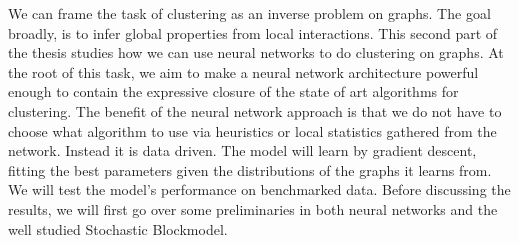 We can frame the task of clustering as an inverse problem on graphs.  The goal broadly, is to infer global properties from local interactions.  This second part of the thesis studies how we can use neural networks to do clustering on graphs.  At the root of this task, we aim to make a neural network architecture powerful enough to contain the expressive closure of the state of art algorithms for clustering.  The benefit of the neural network approach is that we do not have to choose what algorithm to use via heuristics or local statistics gathered from the network.  Instead it is data driven.  The model will learn by gradient descent, fitting the best parameters given the distributions of the graphs it learns from.  We will test the model's performance on benchmarked data.  Before discussing the results, we will first go over some preliminaries in both neural networks and the well studied Stochastic Blockmodel.  

